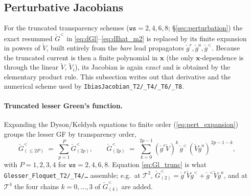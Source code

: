 \documentclass[11pt,a4paper]{article}
\begin{document}
\subsection{Perturbative Jacobians}
\label{sec:pert_jacobian}

For the truncated transparency schemes ($\texttt{ws}=2,4,6,8$;
\S\ref{sec:perturbation}) the exact resummed $\check G^<$ in
\eqref{eq:dGl}--\eqref{eq:dIhat_m2} is replaced by its finite expansion in powers
of $\check V$, built entirely from the \emph{bare} lead propagators
$\check g^r,\check g^a,\check g^<$.  Because the truncated current is then a finite
polynomial in $\mathbf x$ (the only $\mathbf x$-dependence is through the linear
$\check V$, $\check V_i$), its Jacobian is again \emph{exact} and is obtained by
the elementary product rule.  This subsection writes out that derivative and the
numerical scheme used by \texttt{IbiasJacobian\_T2/\_T4/\_T6/\_T8}.

\paragraph{Truncated lesser Green's function.}
Expanding the Dyson/Keldysh equations to finite order (\eqref{eq:pert_expansion})
groups the lesser GF by transparency order,
\begin{equation}
  \check G^<_{(\le 2P)} \;=\; \sum_{p=1}^{P}\check G^<_{(2p)},
  \qquad
  \check G^<_{(2p)} \;=\; \sum_{k=0}^{2p-1}
  (\check g^r\check V)^{k}\,\check g^<\,(\check V\check g^a)^{\,2p-1-k},
  \label{eq:Gl_trunc}
\end{equation}
with $P=1,2,3,4$ for $\texttt{ws}=2,4,6,8$.  Equation \eqref{eq:Gl_trunc} is what
\texttt{Glesser\_Floquet\_T2/\_T4/\dots} assemble; e.g.\ at $\mathcal T^2$,
$\check G^<_{(2)}=\check g^r\check V\check g^<+\check g^<\check V\check g^a$, and at
$\mathcal T^4$ the four chains $k=0,\dots,3$ of $\check G^<_{(4)}$ are added.
\end{document}
